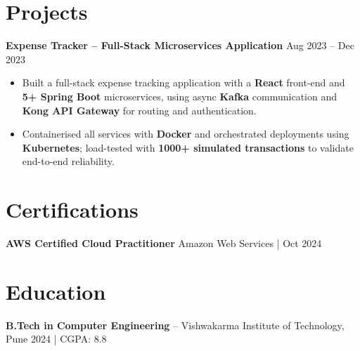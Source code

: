 \documentclass[a4paper,10pt]{article}
\begin{document}
\section*{Projects}

\textbf{Expense Tracker -- Full-Stack Microservices Application} \hfill Aug 2023 -- Dec 2023
\begin{itemize}[leftmargin=*]
    \item Built a full-stack expense tracking application with a \textbf{React} front-end and \textbf{5+ Spring Boot} microservices, using async \textbf{Kafka} communication and \textbf{Kong API Gateway} for routing and authentication.
    \item Containerised all services with \textbf{Docker} and orchestrated deployments using \textbf{Kubernetes}; load-tested with \textbf{1000+ simulated transactions} to validate end-to-end reliability.
\end{itemize}

\section*{Certifications}
\textbf{AWS Certified Cloud Practitioner} \hfill Amazon Web Services \;|\; Oct 2024

\section*{Education}
\textbf{B.Tech in Computer Engineering} -- Vishwakarma Institute of Technology, Pune \hfill 2024 \;|\; CGPA: 8.8
\end{document}
